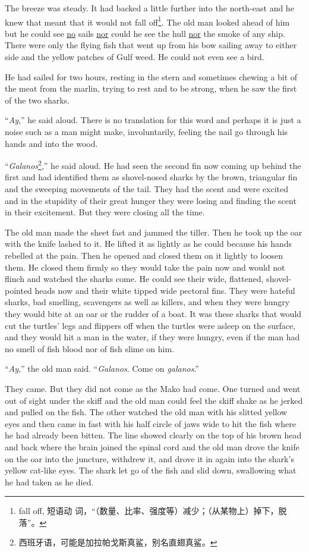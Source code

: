 \documentclass[fontset=ubuntu]{ctexrep}
\begin{document}
The breeze was steady. It had backed a little further into the north-east
and he knew that meant that it would not fall off\footnote{fall off, 短语动
  词，“（数量、比率、强度等）减少；（从某物上）掉下，脱落”。}. The old man
looked ahead of him but he could see \uline{no} sails \uline{nor} could he see the
\gls{hull} \uline{nor} the smoke of any ship. There were only the flying fish that
went up from his bow sailing away to either side and the yellow patches of
Gulf weed. He could not even see a bird.

He had sailed for two hours, resting in the stern and sometimes chewing a
bit of the meat from the marlin, trying to rest and to be strong, when he
saw the first of the two sharks.

``\emph{Ay},'' he said aloud. There is no \gls{translation} for this word and
perhaps it is just a noise such as a man might make, \gls{involuntarily},
feeling the \gls{nail} go through his hands and into the wood.

``\emph{Galanos}\footnote{西班牙语，可能是加拉帕戈斯真鲨，别名直翅真鲨。},'' he
said aloud. He had seen the second fin now coming up behind the first and
had \gls{identified} them as \gls{shovel}-nosed sharks by the brown,
\gls{triangular} fin and the sweeping movements of the tail. They had the
scent and were excited and in the \gls{stupidity} of their great hunger they
were losing and finding the scent in their \gls{excitement}. But they were
closing all the time.

The old man made the sheet fast and \gls{jammed} the tiller. Then he took up
the oar with the knife lashed to it. He lifted it as lightly as he could
because his hands \gls{rebelled} at the pain. Then he opened and closed them
on it lightly to loosen them. He closed them firmly so they would take the
pain now and would not \gls{flinch} and watched the sharks come. He could
see their wide, flattened, shovel-pointed heads now and their white
tipped wide pectoral fins. They were \gls{hateful} sharks, bad
smelling, scavengers as well as killers, and when they were hungry they
would bite at an oar or the \gls{rudder} of a boat. It was these sharks that would
cut the turtles' legs and \glspl{flipper} off when the turtles were asleep
on the surface, and they would hit a man in the water, if they were hungry,
even if the man had no smell of fish blood nor of fish \gls{slime} on him.

``\emph{Ay},'' the old man said. ``\emph{Galanos}. Come on \emph{galanos}.''

They came. But they did not come as the Mako had come. One turned and went
out of sight under the skiff and the old man could feel the skiff \gls{shake} as
he jerked and pulled on the fish. The other watched the old man with his
\gls{slitted} yellow eyes and then came in fast with his half circle of jaws
wide to hit the fish where he had already been bitten. The line showed
clearly on the top of his brown head and back where the brain joined the
\gls{spinal} cord and the old man drove the knife on the oar into the
juncture, \gls{withdrew} it, and drove it in again into the shark's yellow
cat-like eyes. The shark let go of the fish and slid down, swallowing what
he had taken as he died.
\end{document}
